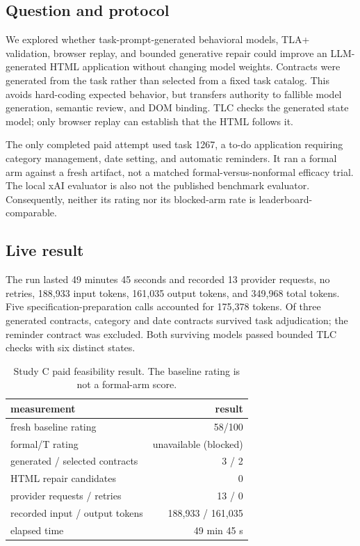 \documentclass[acmsmall,screen,review,anonymous,nonacm]{acmart}
\begin{document}
\subsection{Question and protocol}
We explored whether task-prompt-generated behavioral models, TLA+ validation, browser replay, and bounded generative repair could improve an LLM-generated HTML application without changing model weights. Contracts were generated from the task rather than selected from a fixed task catalog. This avoids hard-coding expected behavior, but transfers authority to fallible model generation, semantic review, and DOM binding. TLC checks the generated state model; only browser replay can establish that the HTML follows it.

The only completed paid attempt used task 1267, a to-do application requiring category management, date setting, and automatic reminders. It ran a formal arm against a fresh artifact, not a matched formal-versus-nonformal efficacy trial. The local xAI evaluator is also not the published benchmark evaluator. Consequently, neither its rating nor its blocked-arm rate is leaderboard-comparable.

\subsection{Live result}
The run lasted 49 minutes 45 seconds and recorded 13 provider requests, no retries, 188{,}933 input tokens, 161{,}035 output tokens, and 349{,}968 total tokens. Five specification-preparation calls accounted for 175{,}378 tokens. Of three generated contracts, category and date contracts survived task adjudication; the reminder contract was excluded. Both surviving models passed bounded TLC checks with six distinct states.

\begin{table}[t]
\centering\small
\caption{Study C paid feasibility result. The baseline rating is not a formal-arm score.}
\label{tab:studyC}
\begin{tabular}{lr}
\toprule
measurement & result \\
\midrule
fresh baseline rating & 58/100 \\
formal/T rating & unavailable (blocked) \\
generated / selected contracts & 3 / 2 \\
HTML repair candidates & 0 \\
provider requests / retries & 13 / 0 \\
recorded input / output tokens & 188{,}933 / 161{,}035 \\
elapsed time & 49 min 45 s \\
\bottomrule
\end{tabular}
\end{table}
\end{document}
